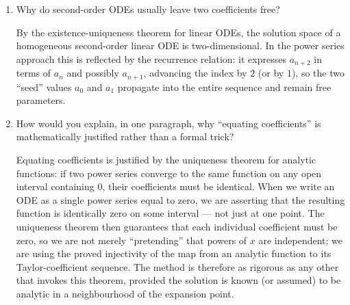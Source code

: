 \documentclass{essay}
\begin{document}
\begin{enumerate}[leftmargin=*, itemsep=8pt]
  \item Why do second-order ODEs usually leave two coefficients free?
    \begin{answer}
      By the existence-uniqueness theorem for linear ODEs, the
      solution space of a homogeneous second-order linear ODE is
      two-dimensional. In the power series approach this is reflected
      by the recurrence relation: it expresses $a_{n+2}$ in terms of
      $a_n$ and possibly $a_{n+1}$, advancing the index by $2$ (or by
      $1$), so the two ``seed'' values $a_0$ and $a_1$ propagate into
      the entire sequence and remain free parameters.
    \end{answer}

  \item How would you explain, in one paragraph, why ``equating
    coefficients'' is mathematically justified rather than a formal trick?
    \begin{answer}
      Equating coefficients is justified by the uniqueness theorem
      for analytic functions: if two power series converge to the
      same function on any open interval containing $0$, their
      coefficients must be identical. When we write an ODE as a
      single power series equal to zero, we are asserting that the
      resulting function is identically zero on some interval --- not
      just at one point. The uniqueness theorem then guarantees that
      each individual coefficient must be zero, so we are not merely
      ``pretending'' that powers of $x$ are independent; we are using
      the proved injectivity of the map from an analytic function to
      its Taylor-coefficient sequence. The method is therefore as
      rigorous as any other that invokes this theorem, provided the
      solution is known (or assumed) to be analytic in a
      neighbourhood of the expansion point.
    \end{answer}
\end{enumerate}
\end{document}
